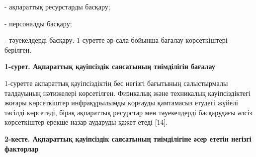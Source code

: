 - ақпараттық ресурстарды басқару;

- персоналды басқару;

- тәуекелдерді басқару.
1-суретте әр сала бойынша бағалау көрсеткіштері берілген.

{\bfseries 1-сурет. Ақпараттық қауіпсіздік саясатының тиімділігін бағалау}

1-суретте ақпараттық қауіпсіздіктің бес негізгі бағытының салыстырмалы
талдауының нәтижелері көрсетілген. Физикалық және техникалық
қауіпсіздіктегі жоғары көрсеткіштер инфрақұрылымды қорғауды қамтамасыз
етудегі жүйелі тәсілді көрсетеді, бірақ ақпараттық ресурстар мен
тәуекелдерді басқарудағы әлсіз көрсеткіштер ерекше назар аударуды қажет
етеді {[}14{]}.

{\bfseries 2-кесте. Ақпараттық қауіпсіздік саясатының тиімділігіне әсер
ететін негізгі факторлар}

